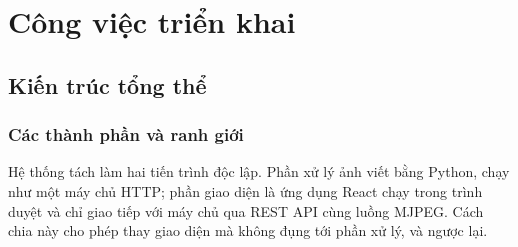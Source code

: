 %
\chapter{Công việc triển khai}
\label{ch:trienkhai}

\section{Kiến trúc tổng thể}
\label{sec:kientruc}

\subsection{Các thành phần và ranh giới}

Hệ thống tách làm hai tiến trình độc lập. Phần xử lý ảnh viết bằng Python, chạy
như một máy chủ HTTP; phần giao diện là ứng dụng React chạy trong trình duyệt và
chỉ giao tiếp với máy chủ qua REST API cùng luồng MJPEG. Cách chia này cho phép
thay giao diện mà không đụng tới phần xử lý, và ngược lại.

